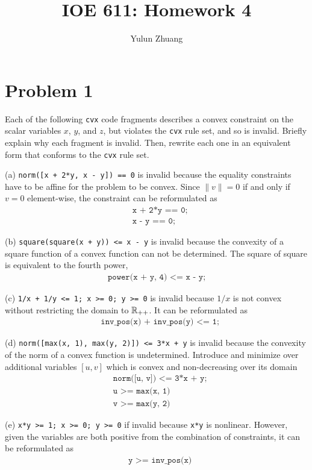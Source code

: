 \documentclass[11pt]{article}
\begin{document}
\title{IOE 611: Homework 4}
\author{Yulun Zhuang}
\maketitle
\section*{Problem 1}
Each of the following \texttt{cvx} code fragments describes a convex constraint on the scalar variables $x$, $y$, and $z$, but violates the \texttt{cvx} rule set, and so is invalid. Briefly explain why each fragment is invalid. Then, rewrite each one in an equivalent form that conforms to the \texttt{cvx} rule set.

(a) \texttt{norm([x + 2*y, x - y]) == 0} is invalid because the equality constraints have to be affine for the problem to be convex. Since $\|v\|=0$ if and only if $v = 0$ element-wise, the constraint can be reformulated as
\begin{align*}
    &\texttt{x + 2*y == 0;} \\
    &\texttt{x - y == 0;}
\end{align*}

(b) \texttt{square(square(x + y)) <= x - y} is invalid because the convexity of a square function of a convex function can not be determined. The square of square is equivalent to the fourth power, 
\begin{align*}
    \texttt{power(x + y, 4) <= x - y;}
\end{align*}

(c) \texttt{1/x + 1/y <= 1; x >= 0; y >= 0} is invalid because $1/x$ is not convex without restricting the domain to ${{\mathbb{R}}}_{++}$. It can be reformulated as
\begin{align*}
    &\texttt{inv\_pos(x) + inv\_pos(y) <= 1;}
\end{align*}

(d) \texttt{norm([max(x, 1), max(y, 2)]) <= 3*x + y} is invalid because the convexity of the norm of a convex function is undetermined. Introduce and minimize over additional variables $[u, v]$ which is convex and non-decreasing over its domain
\begin{align*}
    &\texttt{norm([u, v]) <= 3*x + y;} \\
    &\texttt{u >= max(x, 1)}\\
    &\texttt{v >= max(y, 2)}
\end{align*}

(e) \texttt{x*y >= 1; x >= 0; y >= 0} if invalid because \texttt{x*y} is nonlinear. However, given the variables are both positive from the combination of constraints, it can be reformulated as
\begin{align*}
    &\texttt{y >= inv\_pos(x)}
\end{align*}
\end{document}
